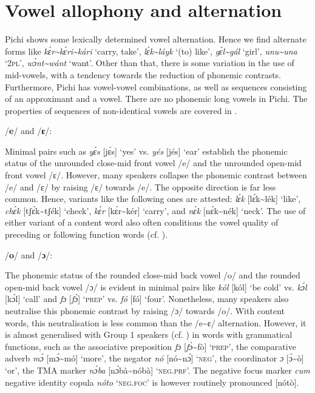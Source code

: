 \section{Vowel allophony and alternation}\label{sec:2.4}

Pichi shows some lexically determined vowel alternation. Hence we find alternate forms like \textit{kɛ́r\textasciitilde kɛ́ri\textasciitilde kári} ‘carry, take’, \textit{lɛ́k\textasciitilde láyk} ‘(to) like’, \textit{gɛ́l\textasciitilde gál} ‘girl’, \textit{unu\textasciitilde una} ‘\textsc{2pl}’, \textit{wɔ́nt\textasciitilde wánt} ‘want’. Other than that, there is some variation in the use of mid-vowels, with a tendency towards the reduction of phonemic contrasts. Furthermore, Pichi has vowel-vowel combinations, as well as sequences consisting of an approximant and a vowel. There are no phonemic long vowels in Pichi. The properties of sequences of non-identical vowels are covered in .

/\textbf{e}/ and /\textbf{ɛ}/: 

Minimal pairs such as \textit{yɛ́s} [jɛ́s] ‘yes’ vs. \textit{yés} [jés] ‘ear’ establish the phonemic status of the unrounded close-mid front vowel /e/ and the unrounded open-mid front vowel /ɛ/. However, many speakers collapse the phonemic contrast between /e/ and /ɛ/ by raising /ɛ/ towards /e/. The opposite direction is far less common. Hence, variants like the following ones are attested: \textit{lɛ́k} [lɛ́k{\textasciitilde}lék] ‘like’, \textit{chɛ́k} [tʃɛ́k{\textasciitilde}tʃék] ‘check’, \textit{kɛ́r} [kɛ́r{\textasciitilde}kér] ‘carry’, and \textit{nɛ́k} [nɛ́k{\textasciitilde}nék] ‘neck’. The use of either variant of a content word also often conditions the vowel quality of preceding or following function words (cf. ).

/\textbf{o}/ and /\textbf{ɔ}/: 

The phonemic status of the rounded close-mid back vowel /o/ and the rounded open-mid back vowel /ɔ/ is evident in minimal pairs like \textit{kól} [kól] ‘be cold’ vs. \textit{kɔ́l} [kɔ́l] ‘call’ and \textit{fɔ} [\textit{\textup{fɔ̀}}] ‘\textsc{prep}’ vs. \textit{fó} [fó] ‘four’. Nonetheless, many speakers also neutralise this phonemic contrast by raising /ɔ/ towards /o/. With content words, this neutralisation is less common than the /e{\textasciitilde}ɛ/ alternation. However, it is almost generalised with Group 1 speakers (cf. ) in words with grammatical functions, such as the associative preposition \textit{fɔ} [\textit{\textup{fɔ̀}}{\textasciitilde}fò] ‘\textsc{prep}’, the comparative adverb \textit{mɔ́} [mɔ́{\textasciitilde}mó] ‘more’, the negator \textit{nó} [nó{\textasciitilde}nɔ́] ‘\textsc{neg}’, the coordinator \textit{ɔ} [ɔ̀{\textasciitilde}ò] ‘or’, the TMA marker \textit{nɔ́ba} [nɔ́bà{\textasciitilde}nóbà] ‘\textsc{neg.prf}’. The negative focus marker \textit{cum} negative identity copula \textit{nóto} ‘\textsc{neg}.\textsc{foc}’ is however routinely pronounced [nótò].

